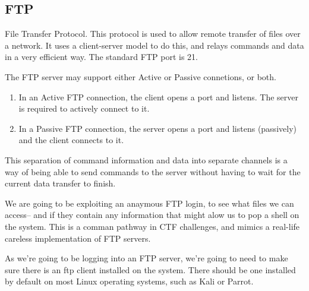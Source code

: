 \documentclass[12pt]{article}
\theoremstyle{definition}
\theoremstyle{definition}
\begin{document}
    \subsection{FTP}
        File Transfer Protocol. This protocol is used to allow remote transfer
        of files over a network. It uses a client-server model to do this, and
        relays commands and data in a very efficient way. The standard FTP port
        is 21.\par The FTP server may support either Active or Passive
        connetions, or both.
        \begin{enumerate}
            \item In an Active FTP connection, the client opens a port and
                listens. The server is required to actively connect to it.
            \item In a Passive FTP connection, the server opens a port and
                listens (passively) and the client connects to it. 
        \end{enumerate}
        This separation of command information and data into separate channels
        is a way of being able to send commands to the server without having to
        wait for the current data transfer to finish. \par We are going to be
        exploiting an anaymous FTP login, to see what files we can access-- and
        if they contain any information that might alow us to pop a shell on
        the system. This is a comman pathway in CTF challenges, and mimics
        a real-life careless implementation of FTP servers.\par As we're going
        to be logging into an FTP server, we're going to need to make sure
        there is an ftp client installed on the system. There should be one
        installed by default on most Linux operating systems, such as Kali or
        Parrot.
\end{document}
